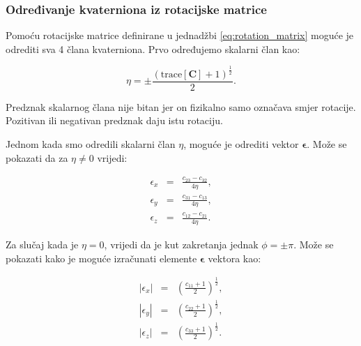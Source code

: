 \documentclass[times, utf8, diplomski, numeric]{templates/template}
\begin{document}
{{{            \subsubsection{Određivanje kvaterniona iz rotacijske matrice}{
                Pomoću rotacijske matrice definirane u jednadžbi \ref{eq:rotation_matrix} moguće je odrediti sva 4 člana kvaterniona. Prvo određujemo skalarni član kao:

                \begin{equation}
                    \eta = \pm\frac{(\text{trace}[\boldsymbol{C}] + 1)^{\frac{1}{2}}}{2}.
                \end{equation}

                Predznak skalarnog člana nije bitan jer on fizikalno samo označava smjer rotacije. Pozitivan ili negativan predznak daju istu rotaciju.

                Jednom kada smo odredili skalarni član $\eta$, moguće je odrediti vektor $\boldsymbol\epsilon$. Može se pokazati da za $\eta \neq 0$ vrijedi:

                \begin{equation}
                \begin{array}{rcl}
                    \epsilon_{x} & = & \frac{c_{23} - c_{32}}{4\eta}, \\
                    \epsilon_{y} & = & \frac{c_{31} - c_{13}}{4\eta}, \\
                    \epsilon_{z} & = & \frac{c_{12} - c_{21}}{4\eta}.
                \end{array}
                \end{equation}

                Za slučaj kada je $\eta=0$, vrijedi da je kut zakretanja jednak $\phi=\pm\pi$. Može se pokazati kako je moguće izračunati elemente $\boldsymbol\epsilon$ vektora kao:

                \begin{equation}
                \begin{array}{rcl}
                    |\epsilon_{x}| & = & (\frac{c_{11} + 1}{2})^{\frac{1}{2}}, \\
                    |\epsilon_{y}| & = & (\frac{c_{22} + 1}{2})^{\frac{1}{2}}, \\
                    |\epsilon_{z}| & = & (\frac{c_{33} + 1}{2})^{\frac{1}{2}}.
                \end{array}
                \end{equation}

}}}}
\end{document}
